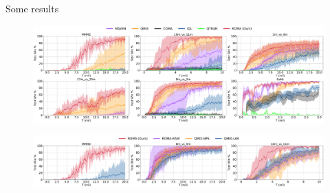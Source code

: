 \documentclass{beamer}
\begin{document}
    \begin{frame}{Some results}

        \begin{figure}
            \includegraphics[width=\linewidth]{img/fig-lc/learning_curve.pdf}
        \end{figure}
        \pause
        \begin{figure}
            \includegraphics[width=\linewidth]{img/fig-lc/ablation.pdf}
        \end{figure}


    \end{frame}
\end{document}
